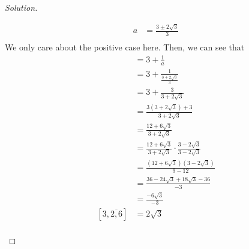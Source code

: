 \documentclass[11pt]{article}
\newenvironment{solution}
  {\renewcommand\qedsymbol{$~$}\begin{proof}[Solution]$ $\par\nobreak\ignorespaces}
  {\end{proof}}
\begin{document}
\begin{solution}
\begin{itemize}
\begin{align*}
            a & =  \frac{3\pm 2 \sqrt{3}}{3}                 \\
          \end{align*}
          We only care about the positive case here.
          Then, we can see that
          \begin{align*}
            [3,\overline{2,6}] & = 3 + \frac{1}{a}                                                          \\
                               & = 3 + \frac{1}{\frac{3+ 2 \sqrt{3}}{3}  }                                  \\
                               & = 3 + \frac{3}{3+ 2 \sqrt{3}}                                              \\
                               & = \frac{3(3+2\sqrt{3})+3}{3+ 2 \sqrt{3}}                                   \\
                               & = \frac{12+6\sqrt{3}}{3+ 2 \sqrt{3}}                                       \\
                               & = \frac{12+6\sqrt{3}}{3+ 2 \sqrt{3}} \cdot \frac{3-2\sqrt{3}}{3-2\sqrt{3}} \\
                               & = \frac{(12+6\sqrt{3})(3-2\sqrt{3})}{9- 12}                                \\
                               & = \frac{36 - 24\sqrt{3} + 18\sqrt{3} -36}{-3}                              \\
                               & = \frac{-6\sqrt{3}}{-3}                                                    \\
            [3,\overline{2,6}] & = 2 \sqrt{3}                                                               \\
          \end{align*}
  \end{itemize}
\end{solution}
\end{document}
